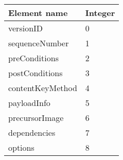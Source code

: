 \begin{longtable}[]{@{}ll@{}}
\toprule
Element name & Integer\tabularnewline
\midrule
\endhead
versionID & 0\tabularnewline
sequenceNumber & 1\tabularnewline
preConditions & 2\tabularnewline
postConditions & 3\tabularnewline
contentKeyMethod & 4\tabularnewline
payloadInfo & 5\tabularnewline
precursorImage & 6\tabularnewline
dependencies & 7\tabularnewline
options & 8\tabularnewline
\bottomrule
\end{longtable}
